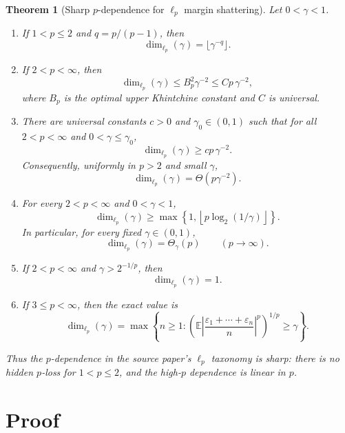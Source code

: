 \documentclass[11pt]{article}
\newtheorem{theorem}{Theorem}
\newcommand{\E}{\mathbb{E}}
\newcommand{\rad}{\varepsilon}
\begin{document}
\begin{theorem}[Sharp \(p\)-dependence for \(\ell_p\) margin shattering]
Let \(0<\gamma<1\).
\begin{enumerate}[label=\textup{(\alph*)}]
\item If \(1<p\le2\) and \(q=p/(p-1)\), then
\[
  \dim_{\ell_p}(\gamma)=\big\lfloor \gamma^{-q}\big\rfloor .
\]
\item If \(2<p<\infty\), then
\[
  \dim_{\ell_p}(\gamma)\le B_p^2\gamma^{-2}\le C p\,\gamma^{-2},
\]
where \(B_p\) is the optimal upper Khintchine constant and \(C\) is universal.
\item There are universal constants \(c>0\) and \(\gamma_0\in(0,1)\) such
that for all \(2<p<\infty\) and \(0<\gamma\le\gamma_0\),
\[
  \dim_{\ell_p}(\gamma)\ge c p\,\gamma^{-2}.
\]
Consequently, uniformly in \(p>2\) and small \(\gamma\),
\[
  \dim_{\ell_p}(\gamma)=\Theta(p\gamma^{-2}).
\]
\item For every \(2<p<\infty\) and \(0<\gamma<1\),
\[
  \dim_{\ell_p}(\gamma)\ge
  \max\left\{1,\left\lfloor p\log_2(1/\gamma)\right\rfloor\right\}.
\]
In particular, for every fixed \(\gamma\in(0,1)\),
\[
  \dim_{\ell_p}(\gamma)=\Theta_\gamma(p)\qquad (p\to\infty).
\]
\item If \(2<p<\infty\) and \(\gamma>2^{-1/p}\), then
\[
  \dim_{\ell_p}(\gamma)=1.
\]
\item If \(3\le p<\infty\), then the exact value is
\[
  \dim_{\ell_p}(\gamma)
  =
  \max\left\{
    n\ge1:
    \left(\E\left|\frac{\rad_1+\cdots+\rad_n}{n}\right|^p\right)^{1/p}
    \ge \gamma
  \right\}.
\]
\end{enumerate}
Thus the \(p\)-dependence in the source paper's \(\ell_p\) taxonomy is sharp:
there is no hidden \(p\)-loss for \(1<p\le2\), and the high-\(p\) dependence is
linear in \(p\).
\end{theorem}

\section*{Proof}
\end{document}
